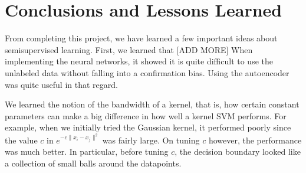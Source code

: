 \documentclass[11pt]{article}
\begin{document}
\section{Conclusions and Lessons Learned}

From completing this project, we have learned a few important ideas about semisupervised learning. First, we learned that [ADD MORE] When implementing the neural networks, it showed it is quite difficult to use the unlabeled data without falling into a confirmation bias. Using the autoencoder was quite useful in that regard.

We learned the notion of the bandwidth of a kernel, that is,
how certain constant parameters can make a big difference in how well
a kernel SVM performs. For example, when we initially tried the
Gaussian kernel, it performed poorly since the value
$c$ in $e^{-c\|x_i-x_j\|^2}$ was fairly large.
On tuning $c$ however, the performance was much better. In particular,
before tuning $c$, the decision boundary looked like a collection of
small balls around the datapoints.



\end{document}
